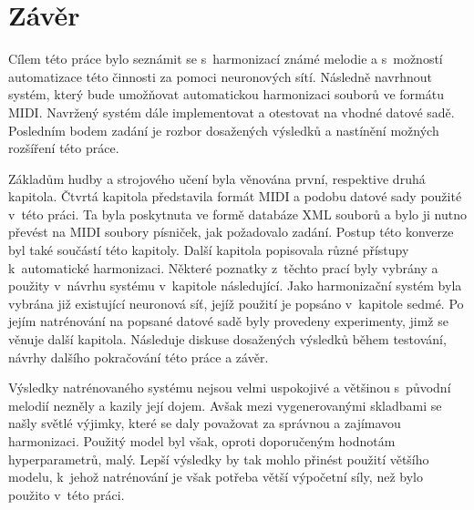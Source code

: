 
\chapter{Závěr}
\label{zaver}
Cílem této práce bylo seznámit se s~harmonizací známé melodie a 
s~možností automatizace této činnosti za pomoci neuronových sítí.
Následně navrhnout systém, který bude umožňovat automatickou harmonizaci 
souborů ve formátu MIDI.
Navržený systém dále implementovat a otestovat na vhodné datové sadě.
Posledním bodem zadání je rozbor dosažených výsledků 
a nastínění možných rozšíření této práce.
\par
Základům hudby a strojového učení byla věnována první,
respektive druhá kapitola.
Čtvrtá kapitola představila formát MIDI 
a podobu datové sady použité v~této práci.
Ta byla poskytnuta ve formě databáze XML souborů 
a bylo ji nutno převést na MIDI soubory písniček, 
jak požadovalo zadání.
Postup této konverze byl také součástí této kapitoly.
Další kapitola popisovala různé přístupy k~automatické harmonizaci. 
Některé poznatky z~těchto prací byly vybrány 
a použity v~návrhu systému v~kapitole následující.
Jako harmonizační systém byla vybrána již existující neuronová síť,
jejíž použití je popsáno v~kapitole sedmé.
Po jejím natrénování na popsané datové sadě byly provedeny experimenty,
jimž se věnuje další kapitola.
Následuje diskuse dosažených výsledků během testování,
návrhy dalšího pokračování této práce a závěr.
\par

Výsledky natrénovaného systému nejsou velmi uspokojivé
a většinou s~původní melodií nezněly a kazily její dojem.
Avšak mezi vygenerovanými skladbami se našly světlé výjimky,
které se daly považovat za správnou a zajímavou harmonizaci.
Použitý model byl však, oproti doporučeným hodnotám hyperparametrů, malý.
Lepší výsledky by tak mohlo přinést použití většího modelu,
k~jehož natrénování je však potřeba větší výpočetní síly, 
než bylo použito v~této práci.

\par

